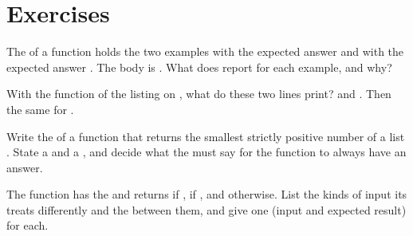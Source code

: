 \section{Exercises}\label{sec:g10:specifications-and-tests:exercises}

\begin{exercise}[$\star$]\label{exo:g10:specifications-and-tests:1}
The  of a function  holds the two examples  with the expected answer
 and  with the expected answer . The body is . What does
 report for each example, and why?
\end{exercise}

\begin{exercise}[$\star$]\label{exo:g10:specifications-and-tests:2}
With the function  of the listing on , what do these two lines print?
 and . Then the same for
.
\end{exercise}

\begin{exercise}[$\star$]\label{exo:g10:specifications-and-tests:3}
Write the  of a function  that returns the smallest strictly positive number of
a list . State a  and a , and decide what the  must say for the
function to always have an answer.
\end{exercise}

\begin{exercise}[$\star$]\label{exo:g10:specifications-and-tests:4}
The function  has the   and returns  if
,  if , and  otherwise. List the kinds of input its  treats
differently and the  between them, and give one  (input and expected result) for each.
\end{exercise}

